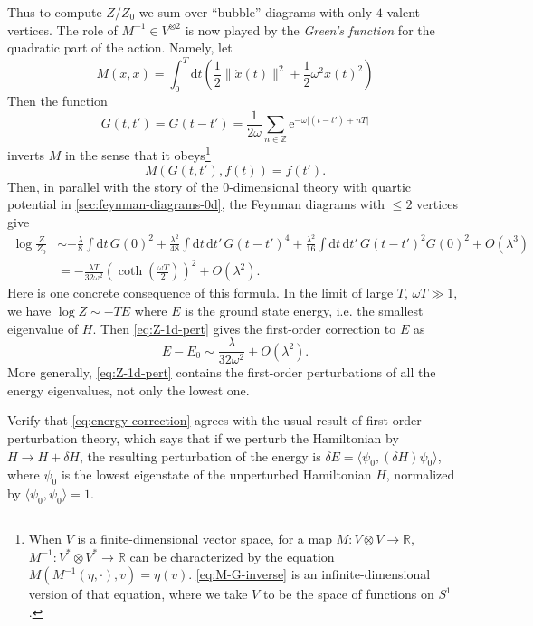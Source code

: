 \documentclass[12pt,letterpaper,reqno]{article}
\numberwithin{equation}{section}
\newcommand{\R}{\ensuremath{\mathbb R}}
\newcommand{\Z}{\ensuremath{\mathbb Z}}
\newcommand{\half}{\ensuremath{\frac{1}{2}}}
\newcommand{\e}{{\mathrm e}}
\newcommand{\de}{\mathrm{d}}
\newcommand{\abs}[1]{\lvert#1\rvert}
\newcommand{\norm}[1]{\lVert#1\rVert}
\newcommand{\IP}[1]{\langle#1\rangle}
\newcommand{\ti}[1]{\textit{#1}}
\begin{document}
Thus to compute $Z/Z_0$ we sum over ``bubble'' diagrams with only
$4$-valent vertices.
The role of $M^{-1} \in V^{\otimes 2}$ is now played by
the \ti{Green's function} for the quadratic part of the action.
Namely, let
\begin{equation}
 M(x,x) = \int_0^T \de t \left(\half \norm{\dot x(t)}^2 + \half \omega^2 x(t)^2\right)  
\end{equation}
Then the function
\begin{equation}
  G(t,t') = G(t-t') = \frac{1}{2 \omega} \sum_{n \in \Z} \e^{-\omega \abs{(t-t') + n T}}
\end{equation}
inverts $M$ in the sense that it obeys\footnote{When $V$ is a finite-dimensional vector space, 
for a map $M: V \otimes V \to \R$, $M^{-1}: V^* \otimes V^* \to \R$ can be characterized by the equation $M(M^{-1}(\eta, \cdot), v) = \eta(v).$
\eqref{eq:M-G-inverse} is an infinite-dimensional version of that equation, 
where we take $V$ to be the space of functions on $S^1$.}
\begin{equation} \label{eq:M-G-inverse}
  M\left(G(t,t'), f(t)\right) = f(t').
\end{equation}
Then, in parallel with the story of the $0$-dimensional theory
with quartic potential in \autoref{sec:feynman-diagrams-0d},
the Feynman diagrams with $\le 2$ vertices give
\begin{align} \label{eq:Z-1d-pert-first}
  \log \frac{Z}{Z_0} &\sim - \frac{\lambda}{8} \int \de t \, G(0)^2 + \frac{\lambda^2}{48} \int \de t \, \de t' \, G(t-t')^4 + \frac{\lambda^2}{16} \int \de t \, \de t' \, G(t-t')^2 G(0)^2 + O(\lambda^3) \\
  &= - \frac{\lambda T}{32 \omega^2} \left(\coth\left(\frac{\omega T}{2}\right)\right)^2 + O(\lambda^2). \label{eq:Z-1d-pert}
\end{align}
Here is one concrete consequence of this formula.
In the limit of large $T$, $\omega T \gg 1$, 
we have $\log Z \sim -T E$
where $E$ is the ground state energy, i.e. the smallest eigenvalue 
of $H$. Then
\eqref{eq:Z-1d-pert} gives the first-order correction
to $E$ as 
\begin{equation} \label{eq:energy-correction}
  E - E_0 \sim \frac{\lambda}{32 \omega^2} + O(\lambda^2).
\end{equation}
More generally, \eqref{eq:Z-1d-pert} contains the 
first-order perturbations
of all the energy eigenvalues, not only the lowest one.

\begin{exercise} Verify that \eqref{eq:energy-correction} 
agrees with the usual
result of first-order perturbation theory, which says that
if we perturb the Hamiltonian by $H \to H + \delta H$, the 
resulting perturbation of the energy is
$\delta E = \IP{\psi_0, (\delta H) \psi_0}$, where $\psi_0$ is the
lowest eigenstate of the unperturbed Hamiltonian $H$,
normalized by $\IP{\psi_0, \psi_0} = 1$.
\end{exercise}
\end{document}
